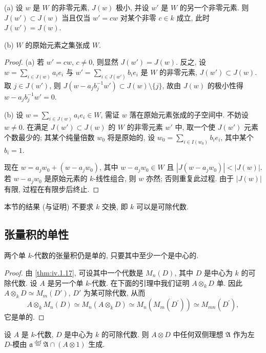 \begin{proposition}\label{prop:iv.2.5}
(a) 设 $w$ 是 $W$ 的非零元素, $J(w)$ 极小, 并设 $w'$ 是 $W$ 的另一个非零元素. 则 $J(w')\subset J(w)$ 当且仅当 $w'=cw$ 对某个非零 $c\in k$ 成立, 此时 $J(w')=J(w)$.

(b) $W$ 的原始元素之集张成 $W$.
\end{proposition}

\begin{proof}
(a) 若 $w'=cw$, $c\neq 0$, 则显然 $J(w')=J(w)$. 反之, 设 $w=\sum_{i\in J(w)}a_ie_i$ 与 $w'=\sum_{i\in J(w')}b_ie_i$ 是 $W$ 的非零元素, $J(w')\subset J(w)$. 取 $j\in J(w')$, 则 $J(w-a_jb_j^{-1}w')\subset J(w)\setminus\{j\}$, 故由 $J(w)$ 的极小性得 $w-a_jb_j^{-1}w'=0$.

(b) 设 $w=\sum_{i\in J(w)}a_ie_i\in W$, 需证 $w$ 落在原始元素张成的子空间中. 不妨设 $w\neq 0$. 在满足 $J(w')\subset J(w)$ 的 $W$ 的非零元素 $w'$ 中, 取一个使 $J(w')$ 元素个数最少的; 其某个纯量倍数 $w_0$ 将是原始的, 设 $w_0=\sum_{i\in I(w_0)}b_ie_i$, 其中某个 $b_i=1$.

现在 $w=a_jw_0+(w-a_jw_0)$, 其中 $w-a_jw_0\in W$ 且 $|J(w-a_jw_0)|<|J(w)|$. 若 $w-a_jw_0$ 是原始元素的 $k$-线性组合, 则 $w$ 亦然; 否则重复此过程. 由于 $|J(w)|$ 有限, 过程在有限步后终止.
\end{proof}

本节的结果 (与证明) 不要求 $k$ 交换, 即 $k$ 可以是可除代数.

\subsection*{张量积的单性}

\begin{proposition}\label{prop:iv.2.6}
两个单 $k$-代数的张量积仍是单的, 只要其中至少一个是中心的.
\end{proposition}

\begin{proof}
由 \ref{thm:iv.1.17}, 可设其中一个代数是 $M_n(D)$, 其中 $D$ 是中心为 $k$ 的可除代数. 设 $A$ 是另一个单 $k$-代数. 在下面的引理中我们证明 $A\otimes_k D$ 单. 因此 $A\otimes_k D\simeq M_m(D')$, $D'$ 为某可除代数, 从而
\[
A\otimes_{k}M_{n}(D)\simeq M_{n}(A\otimes_{k}D)\simeq M_{n}(M_{m}(D^{\prime}))\simeq M_{mn}(D^{\prime}),
\]
它是单的.
\end{proof}

\begin{lemma}\label{lem:iv.2.7}
设 $A$ 是 $k$-代数, $D$ 是中心为 $k$ 的可除代数. 则 $A\otimes D$ 中任何双侧理想 $\mathfrak{A}$ 作为左 $D$-模由 $\mathfrak{a}\stackrel{\mathrm{def}}{=}\mathfrak{A}\cap(A\otimes 1)$ 生成.
\end{lemma}

